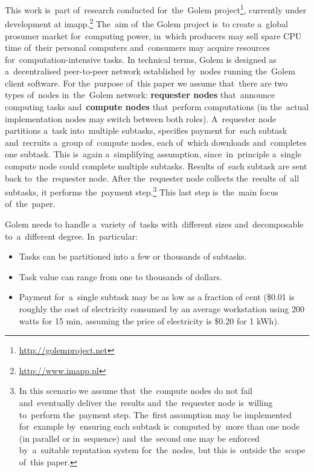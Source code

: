 \documentclass[a4paper]{article}
\begin{document}
    This work is~part of~research conducted for~the~Golem project\footnote{\url{http://golemproject.net}}, currently under
    development at imapp.\footnote{%
      \url{http://www.imapp.pl}} The~aim of~the Golem project is~to create a~global prosumer market for~computing power,
    in~which producers may sell spare CPU time of~their personal computers and~consumers
    may acquire resources for~computation-intensive tasks. In technical terms, Golem is designed as a~decentralised
    peer-to-peer network established by~nodes running the~Golem client software. For the~purpose of~this paper
    we assume that~there are two types of~nodes in~the~Golem network: \textbf{requester nodes} that~announce computing
    tasks and~\textbf{compute nodes} that~perform computations (in the~actual implementation nodes may switch between
    both roles).
    A~requester node partitions a~task into~multiple subtasks, specifies payment for~each subtask and~recruits
    a~group of~compute nodes, each of~which downloads and~completes one subtask. This  is~again a~simplifying
    assumption, since~in~principle a~single compute node could complete multiple subtasks.
    Results of~each subtask are sent back to~the~requester node. After the~requester node collects the~results of~all
    subtasks, it performs the~payment step.\footnote{In this scenario we assume that~the~compute nodes do not fail
    and~eventually deliver the~results and~the~requester node  is~willing to~perform the~payment step.
    The~first assumption may be implemented for~example by~ensuring each subtask is~computed by~more than one node
    (in parallel or in~sequence) and~the~second one may be enforced by~a~suitable reputation system for~the~nodes,
    but this  is~outside the~scope of~this paper.} This last step  is~the~main focus of~the~paper.

    Golem needs to handle a~variety of~tasks with~different sizes and~decomposable to~a~different degree. In~particular:
    \begin{itemize}
    \item Tasks can be partitioned into a few or thousands of subtasks. 
    \item Task value can range from one to thousands of dollars.
    \item Payment for~a~single subtask may be as low as a fraction of cent (\$0.01 is roughly the cost of electricity
      consumed by an average workstation using 200 watts for 15 min, assuming the price of electricity is \$0.20 for 1 kWh).
    \end{itemize}
\end{document}
